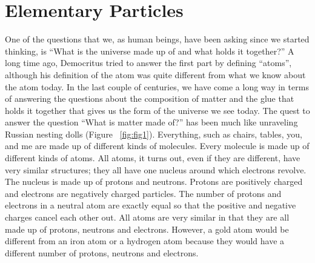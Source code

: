 
\section{Elementary Particles}
One of the questions that we, as human beings, have been asking since we started thinking, is ``What is the universe made up of and what holds it together?'' A long time ago, Democritus tried to answer the first part by defining “atoms”, although his definition of the atom was quite different from what we know about the atom today. In the last couple of centuries, we have come a long way in terms of answering the questions about the composition of matter and the glue that holds it together that gives us the form of the universe we see today.
The quest to answer the question ``What is matter made of?'' 
has been much like unraveling Russian nesting dolls (Figure ~\ref{fig:fig1}). 
Everything, such as chairs, tables, you, and me are 
made up of different kinds of molecules. Every molecule is made up of different kinds of atoms. All atoms, it turns out, even if they are different, have very similar structures; they all have one nucleus around which electrons revolve. The nucleus is made up of protons and neutrons. Protons are positively charged and electrons are negatively charged particles. The number of protons and electrons in a neutral atom are exactly equal so that the positive and negative charges cancel each other out.  All atoms are very similar in that they are all made up of protons, neutrons and electrons. However, a gold atom would be different from an iron atom or a hydrogen atom because they would have a different number of protons, neutrons and electrons.  





